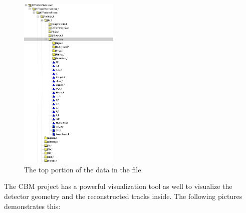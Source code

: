 \documentclass[a4paper,12pt]{article}
\begin{document}
\begin{figure}[H]
	\centering
	\includegraphics[width=0.42\textwidth]{particle_file.png}
	\caption{ The top portion of the data in the file. }
\end{figure}
\vspace{5mm} 
\par  The CBM project has a powerful visualization tool as well to visualize the detector geometry and the reconstructed tracks inside. The following pictures demonstrates this:
\end{document}
